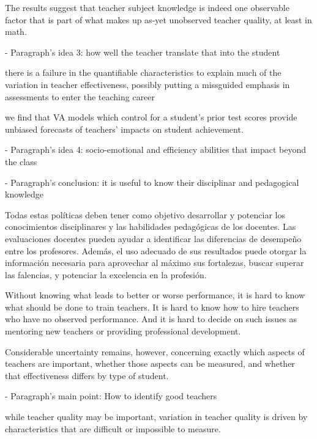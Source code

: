 The results suggest that teacher subject knowledge is indeed one observable factor that is
part of what makes up as-yet unobserved teacher quality, at least in math. \citep{Metzler_et_al_2012} 




- Paragraph's idea 3: how well the teacher translate that into the student

there is a failure in the quantifiable characteristics to explain much of the variation in teacher effectiveness, possibly putting a missguided emphasis in assessments to enter the teaching career \citep{Hanushek_et_al_2012}


we find that VA models which control for a student’s prior test scores provide unbiased forecasts of teachers’ impacts on student achievement. \citep{Chetty_et_al_2014b}



- Paragraph's idea 4: socio-emotional and efficiency abilities that impact beyond the class




- Paragraph's conclusion: it is useful to know their disciplinar and pedagogical knowledge 

Todas estas políticas deben tener como objetivo desarrollar y potenciar los conocimientos disciplinares y las habilidades pedagógicas de los docentes. Las evaluaciones docentes pueden ayudar a identificar las diferencias de desempeño entre los profesores. Además, el uso adecuado de sus resultados puede otorgar la información necesaria para aprovechar al máximo sus fortalezas, buscar superar las falencias, y potenciar la excelencia en la profesión. \citep{Hincapie_et_al_2020}


Without knowing what leads to better or worse performance, it is hard to know what should be done to train teachers. It is hard to know how to hire teachers who have no observed performance. And it is hard to decide on such issues as mentoring new teachers or providing professional development. \citep{Hanushek_et_al_2012}


Considerable uncertainty remains, however, concerning exactly which aspects of teachers are important, whether those aspects can be measured, and whether that effectiveness differs by type of student. \citep{Clotfelter_et_al_2006}




- Paragraph's main point: How to identify good teachers

while teacher quality may be important, variation in teacher quality is driven by characteristics that are difficult or impossible to measure. \citep{Rockoff_2004}


